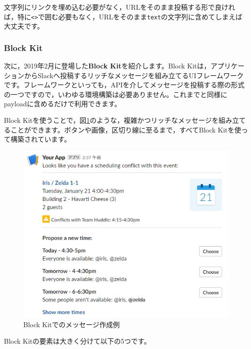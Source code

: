 \documentclass[uplatex,a4j]{jsarticle}
\begin{document}
文字列にリンクを埋め込む必要がなく，URLをそのまま投稿する形で良ければ，特に\verb|<>|で囲む必要もなく，URLをそのまま\verb|text|の文字列に含めてしまえば大丈夫です。

\subsubsection{Block Kit}

次に，2019年2月に登場した\textbf{Block Kit}を紹介します。Block Kitは，アプリケーションからSlackへ投稿するリッチなメッセージを組み立てるUIフレームワークです。フレームワークといっても，APIを介してメッセージを投稿する際の形式の一つですので，いわゆる環境構築は必要ありません。これまでと同様にpayloadに含めるだけで利用できます。

Block Kitを使うことで，図\ref{fig:block_kit_example}のような，複雑かつリッチなメッセージを組み立てることができます。ボタンや画像，区切り線に至るまで，すべてBlock Kitを使って構築されています。

\begin{figure}[H]
 \centering
 \includegraphics[keepaspectratio, scale=0.7]{images/block_kit_example.png}
 \caption{Block Kitでのメッセージ作成例}
 \label{fig:block_kit_example}
\end{figure}

Block Kitの要素は大きく分けて以下の5つです。
\end{document}
